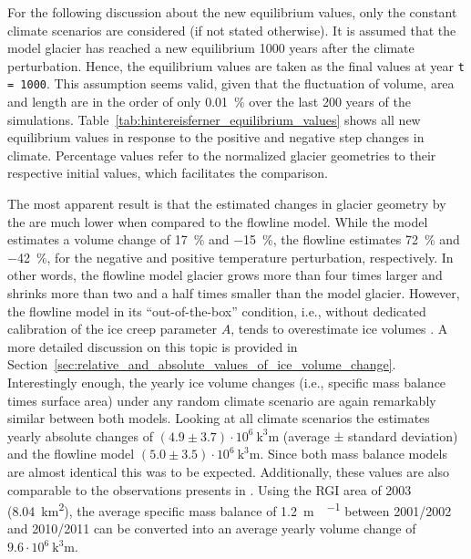        For the following discussion about the new equilibrium values, only the constant climate scenarios are considered (if not stated otherwise). It is assumed that the model glacier has reached a new equilibrium 1000 years after the climate perturbation. Hence, the equilibrium values are taken as the final values at year \lstinline`t = 1000`. This assumption seems valid, given that the fluctuation of volume, area and length are in the order of only \SI{0.01}{\percent}\footnotemark{} over the last 200 years of the simulations.
        Table~\ref{tab:hintereisferner_equilibrium_values} shows all new equilibrium values in response to the positive and negative step changes in climate. Percentage values refer to the normalized glacier geometries to their respective initial values, which facilitates the comparison.
        
        The most apparent result is that the estimated changes in glacier geometry by the \vas{} are much lower when compared to the flowline model. While the \vas{} model estimates a volume change of \SI{+17}{\percent} and \SI{-15}{\percent}, the flowline estimates \SI{+72}{\percent} and \SI{-42}{\percent}, for the negative and positive temperature perturbation, respectively. In other words, the flowline model glacier grows more than four times larger and shrinks more than two and a half times smaller than the \vas{} model glacier. However, the flowline model in its ``out-of-the-box'' condition, i.e., without dedicated calibration of the ice creep parameter $A$, tends to overestimate ice volumes \citep[cf.][]{Maussion2019, Farinotti2019}. A more detailed discussion on this topic is provided in Section~\ref{sec:relative_and_absolute_values_of_ice_volume_change}. Interestingly enough, the yearly ice volume changes (i.e., specific mass balance times surface area) under any random climate scenario are again remarkably similar between both models. Looking at all climate scenarios the \vas{} estimates yearly absolute changes of $(4.9\pm3.7)\cdot10^6\ \si{\cubic\kilo\meter}$ (average ± standard deviation) and the flowline model $(5.0\pm3.5)\cdot10^6\ \si{\cubic\kilo\meter}$. Since both mass balance models are almost identical this was to be expected. Additionally, these values are also comparable to the observations presents in \citet{Klug2018}. Using the RGI area of 2003 (\SI{8.04}{\square\kilo\meter}), the average specific mass balance of \SI{1.2}{\meter\waterequivalent\per\year} between 2001/2002 and 2010/2011 can be converted into an average yearly volume change of $9.6\cdot10^6\ \si{\cubic\kilo\meter}$.

